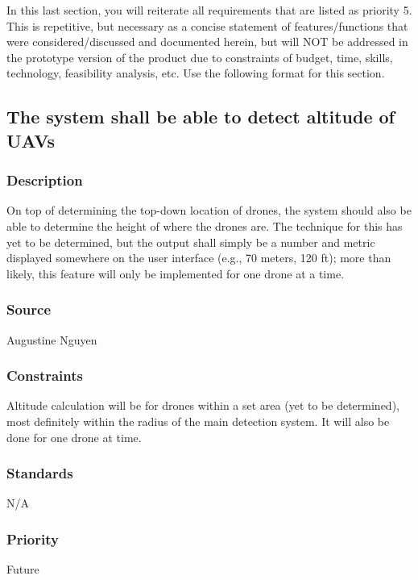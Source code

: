 In this last section, you will reiterate all requirements that are listed as priority 5. This is repetitive, but necessary as a concise statement of features/functions that were considered/discussed and documented herein, but will NOT be addressed in the prototype version of the product due to constraints of budget, time, skills, technology, feasibility analysis, etc. Use the following format for this section.

\subsection{The system shall be able to detect altitude of UAVs}
\subsubsection{Description}
On top of determining the top-down location of drones, the system should also be able to determine the height of where the drones are.  The technique for this has yet to be determined, but the output shall simply be a number and metric displayed somewhere on the user interface (e.g., 70 meters, 120 ft); more than likely, this feature will only be implemented for one drone at a time.
\subsubsection{Source}
Augustine Nguyen
\subsubsection{Constraints}
Altitude calculation will be for drones within a set area (yet to be determined), most definitely within the radius of the main detection system.  It will also be done for one drone at time.
\subsubsection{Standards}
N/A
\subsubsection{Priority}
Future